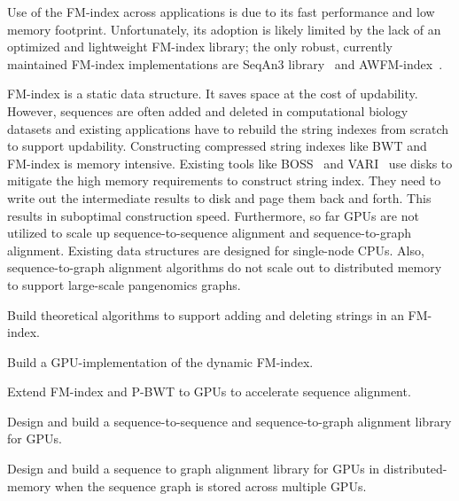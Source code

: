 Use of the FM-index across applications is due to its fast performance and low memory footprint. Unfortunately, its adoption is likely limited by the lack of an optimized and lightweight FM-index library; the only robust, currently maintained FM-index implementations are SeqAn3 library~\cite{Reinert2017} and AWFM-index~\cite{Anderson2021}.

FM-index is a static data structure. It saves space at the cost of updability. However, sequences are often added and deleted in computational biology datasets and existing applications have to rebuild the string indexes from scratch to support updability. 
%
Constructing compressed string indexes like BWT and FM-index is memory intensive. Existing tools like BOSS~\cite{Bowe2012} and VARI~\cite{Muggli2019} use disks to mitigate the high memory requirements to construct string index. They need to write out the intermediate results to disk and page them back and forth. This results in suboptimal construction speed.
%
Furthermore, so far GPUs are not utilized to scale up sequence-to-sequence alignment and sequence-to-graph alignment. Existing data structures are designed for single-node CPUs. Also, sequence-to-graph alignment algorithms do not scale out to distributed memory to support large-scale pangenomics graphs.

\begin{rproblem}
Build theoretical algorithms to support adding and deleting strings in an FM-index.
\label{rpob:dynamic-fmindex}
\end{rproblem}

\begin{rproblem}
Build a GPU-implementation of the dynamic FM-index.
\label{rpob:gpu-fmindex}
\end{rproblem}

\begin{rproblem}
Extend FM-index and P-BWT to GPUs to accelerate sequence alignment.
\end{rproblem}

\begin{rproblem}
Design and build a sequence-to-sequence and sequence-to-graph alignment library for GPUs.
\end{rproblem}


\begin{rproblem}
Design and build a sequence to graph alignment library for GPUs in distributed-memory when the sequence graph is stored across multiple GPUs.
\end{rproblem}

